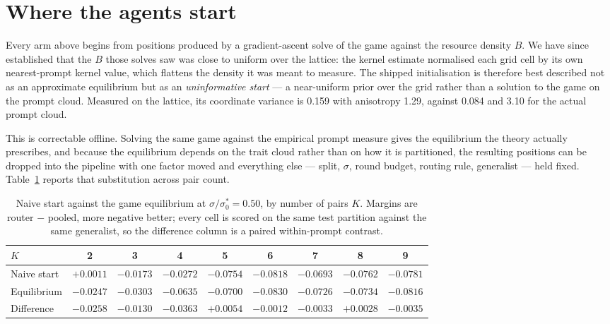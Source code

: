 \documentclass{article}
\begin{document}
\section{Where the agents start}
\label{sec:init}
Every arm above begins from positions produced by a gradient-ascent solve of the game against the
resource density $B$. We have since established that the $B$ those solves saw was close to uniform
over the lattice: the kernel estimate normalised each grid cell by its own nearest-prompt kernel
value, which flattens the density it was meant to measure. The shipped initialisation is therefore
best described not as an approximate equilibrium but as an \emph{uninformative start} --- a
near-uniform prior over the grid rather than a solution to the game on the prompt cloud. Measured on
the lattice, its coordinate variance is 0.159 with anisotropy 1.29, against 0.084 and 3.10 for the
actual prompt cloud.

This is correctable offline. Solving the same game against the empirical prompt measure gives the
equilibrium the theory actually prescribes, and because the equilibrium depends on the trait cloud
rather than on how it is partitioned, the resulting positions can be dropped into the pipeline with
one factor moved and everything else --- split, $\sigma$, round budget, routing rule, generalist ---
held fixed. Table~\ref{tab:init} reports that substitution across pair count.

\begin{table}[t]
\centering
\caption{Naive start against the game equilibrium at $\sigma/\sigma_0^*=0.50$, by number of pairs
$K$. Margins are router $-$ pooled, more negative better; every cell is scored on the same test
partition against the same generalist, so the difference column is a paired within-prompt contrast.}
\label{tab:init}
\small
\begin{tabular}{lcccccccc}
\toprule
$K$ & 2 & 3 & 4 & 5 & 6 & 7 & 8 & 9 \\
\midrule
Naive start   & $+0.0011$ & $-0.0173$ & $-0.0272$ & $-0.0754$ & $-0.0818$ & $-0.0693$ & $-0.0762$ & $-0.0781$ \\
Equilibrium   & $-0.0247$ & $-0.0303$ & $-0.0635$ & $-0.0700$ & $-0.0830$ & $-0.0726$ & $-0.0734$ & $-0.0816$ \\
\midrule
Difference    & $-0.0258$ & $-0.0130$ & $-0.0363$ & $+0.0054$ & $-0.0012$ & $-0.0033$ & $+0.0028$ & $-0.0035$ \\
\bottomrule
\end{tabular}
\end{table}
\end{document}
